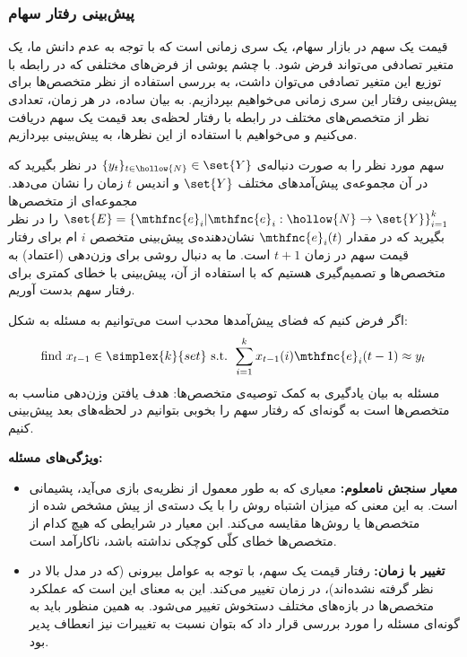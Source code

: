 \documentclass[a4paper,11px]{article}
\begin{document}
\subsubsection{
پیش‌بینی رفتار سهام
}


قیمت یک سهم در بازار سهام، یک سری زمانی است که با توجه به عدم دانش ما، یک متغیر تصادفی می‌تواند فرض شود. با چشم پوشی از فرض‌های مختلفی که در رابطه با توزیع این متغیر تصادفی می‌توان داشت، به بررسی استفاده از نظر متخصص‌ها برای پیش‌بینی رفتار این سری زمانی می‌خواهیم بپردازیم. به بیان ساده، در هر زمان، تعدادی نظر از متخصص‌های مختلف در رابطه با رفتار لحظه‌ی بعد قیمت یک سهم دریافت می‌کنیم و می‌خواهیم با استفاده از این نظرها، به پیش‌بینی بپردازیم.

سهم مورد نظر را به صورت دنباله‌ی
$\{ y_t \}_{t \in \hollow{N}} \in \set{Y}$
در نظر بگیرید که در آن مجموعه‌ی پیش‌آمدهای مختلف
$\set{Y}$
و اندیس
$t$
زمان را نشان می‌دهد. مجموعه‌ای از متخصص‌ها
$\set{E} = \left\lbrace \mthfnc{e}_i \vert \mthfnc{e}_i: \hollow{N} \rightarrow \set{Y} \right\rbrace^{k}_{i=1}$
را در نظر بگیرید که در مقدار
$\mthfnc{e}_i(t)$
نشان‌دهنده‌ی پیش‌بینی متخصص
$i$
ام برای رفتار قیمت سهم در زمان
$t+1$
است. ما به دنبال روشی برای وزن‌دهی (اعتماد) به متخصص‌ها و تصمیم‌گیری هستیم که با استفاده از آن، پیش‌بینی با خطای کمتری برای رفتار سهم بدست آوریم.

اگر فرض کنیم که فضای پیش‌آمدها محدب است می‌توانیم به مسئله به شکل:
\[
\mbox{find } x_{t-1} \in \simplex{k}{set} \mbox{ s.t. } \sum^{k}_{i=1} x_{t-1}(i) \mthfnc{e}_i(t-1) \approx y_t
\]
مسئله به بیان یادگیری به کمک توصیه‌ی متخصص‌ها: هدف یافتن وزن‌دهی مناسب به متخصص‌ها است به گونه‌ای که رفتار سهم را بخوبی بتوانیم در لحظه‌های بعد پیش‌بینی کنیم.

\textbf{
ویژگی‌های مسئله:
}
\begin{itemize}
\item\textbf{
معیار سنجش نامعلوم:
}
معیاری که به طور معمول از نظریه‌ی بازی
می‌آید، پشیمانی
است. به این معنی که میزان اشتباه روش را با یک دسته‌ی از پیش مشخص شده از متخصص‌ها یا روش‌ها مقایسه می‌کند. ابن معیار در شرایطی که هیچ کدام از متخصص‌ها خطای کلّی کوچکی نداشته باشد، ناکارآمد است.
\item\textbf{
تغییر با زمان:
}
رفتار قیمت یک سهم، با توجه به عوامل بیرونی (که در مدل بالا در نظر گرفته نشده‌اند)، در زمان تغییر می‌کند. این به معنای این است که عملکرد متخصص‌ها در بازه‌های مختلف دستخوش تغییر می‌شود. به همین منظور باید به گونه‌ای مسئله را مورد بررسی قرار داد که بتوان نسبت به تغییرات نیز انعطاف پدیر بود.
\end{itemize}
\end{document}
